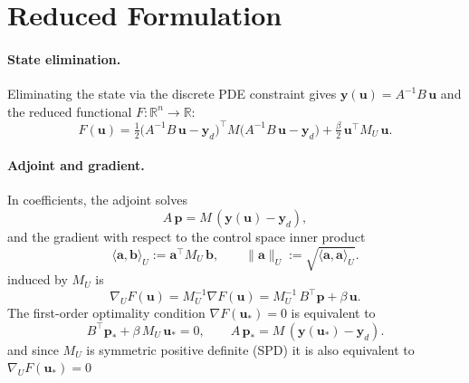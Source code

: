 \documentclass[11pt,a4paper]{article}
\begin{document}
\section{Reduced Formulation}
\paragraph{State elimination.} Eliminating the state via the discrete PDE constraint gives \(\mathbf{y}(\mathbf{u})=A^{-1}B\,\mathbf{u}\) and the reduced functional \(F\colon\mathbb{R}^n\to\mathbb{R}\):
\begin{equation}
  F(\mathbf{u}) = \tfrac12 \big(A^{-1} B\, \mathbf{u} - \mathbf{y}_d\big)^\top M \big(A^{-1} B\, \mathbf{u} - \mathbf{y}_d\big) + \tfrac{\beta}{2}\, \mathbf{u}^\top M_U\, \mathbf{u}.
\end{equation}

\paragraph{Adjoint and gradient.} In coefficients, the adjoint solves
\begin{equation}
  A\, \mathbf{p} = M\, (\mathbf{y}(\mathbf{u}) - \mathbf{y}_d),
\end{equation}
and the gradient with respect to the control space inner product 
\begin{equation}
	\langle \mathbf{a}, \mathbf{b} \rangle_U := \mathbf{a}^\top M_U\, \mathbf{b}, \qquad \|\mathbf{a}\|_U := \sqrt{\langle \mathbf{a}, \mathbf{a} \rangle_U}.
\end{equation}
induced by \(M_U\) is
\begin{equation}
  \nabla_U F(\mathbf{u}) = M_U^{-1}\nabla F(\mathbf{u}) = M_U^{-1}\, B^\top \mathbf{p} + \beta\, \mathbf{u}.
\end{equation}
The first-order optimality condition \(\nabla F(\mathbf{u}_*)=0\) is equivalent to
\begin{equation}
  B^\top \mathbf{p}_* + \beta\, M_U\, \mathbf{u}_* = 0, \qquad A\, \mathbf{p}_* = M\, (\mathbf{y}(\mathbf{u}_*)-\mathbf{y}_d).
\end{equation}
and since $M_U$ is symmetric positive definite (SPD) it is also equivalent to $\nabla_U F(\mathbf{u}_*) = 0$
\end{document}
